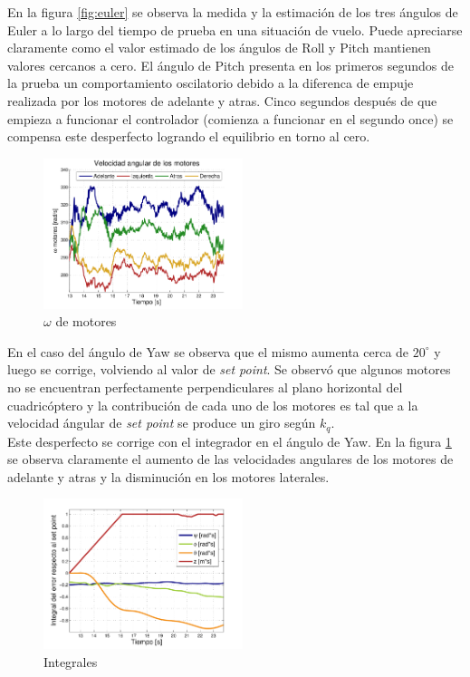 \documentclass[main]{subfiles}
\begin{document}
En la figura \ref{fig:euler} se observa la medida y la estimaci\'on de los tres \'angulos de Euler a lo largo del tiempo de prueba en una situaci\'on de vuelo. Puede apreciarse claramente como el valor estimado de los \'angulos de Roll y Pitch mantienen valores cercanos a cero. El \'angulo de Pitch presenta en los primeros segundos de la prueba un comportamiento oscilatorio debido a la diferenca de empuje realizada por los motores de adelante y atras. Cinco segundos después de que empieza a funcionar el controlador (comienza a funcionar en el segundo once) se compensa este desperfecto logrando el equilibrio en torno al cero.

\begin{figure}
	\centering
	\vspace{-15pt}
	\includegraphics[width=0.52\textwidth]{./pics_test_control/w.pdf}
	\vspace{-15pt}
	\caption{$\omega$ de motores}
	\vspace{-20pt}
	\label{fig:w}
\end{figure}

En el caso del \'angulo de Yaw se observa que el mismo aumenta cerca de $20 ^\circ$ y luego se corrige, volviendo al valor de \emph{set point}. Se observ\'o que algunos motores no se encuentran perfectamente perpendiculares al plano horizontal del cuadric\'optero y la contribuci\'on de cada uno de los motores es tal que a la velocidad \'angular de \emph{set point} se produce un giro seg\'un $k_q$.\\ 

Este desperfecto se corrige con el integrador en el \'angulo de Yaw. En la figura \ref{fig:w} se observa claramente el aumento de las velocidades angulares de los motores de adelante y atras y la disminuci\'on en los motores laterales.\\ 

\begin{figure}
	\centering
	\vspace{-10pt}
	\includegraphics[width=0.52\textwidth]{./pics_test_control/int.pdf}
	\caption{Integrales}
	\label{fig:int}
\end{figure}
\end{document}
